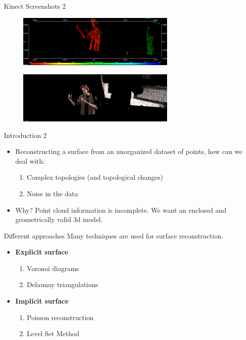 \documentclass{beamer}
\begin{document}
\begin{frame}{Kinect Screenshots 2}
  \begin{figure}[H]
  \centering
  \includegraphics[width=0.7\textwidth]{img/pts.png}
  \end{figure}
  \begin{figure}[H]
  \centering
  \includegraphics[width=0.7\textwidth]{img/pcl.png}
  \end{figure}
\end{frame}

\begin{frame}{Introduction 2}
  \begin{itemize}
  \item Reconstructing a surface from an unorganized dataset of points, how can we deal with:
  \begin{enumerate}
    \item Complex topologies (and topological changes)
    \item Noise in the data
  \end{enumerate}
  \item Why? Point cloud information is incomplete. We want an enclosed and geometrically valid 3d model.
  \end{itemize}
\end{frame}

\begin{frame}{Different approaches}
  Many techniques are used for surface reconstruction.
  \begin{itemize} %
  \item \textbf{Explicit surface} %
  \begin{enumerate}
    \item Voronoi diagrams
    \item Delaunay triangulations
  \end{enumerate}
  \item \textbf{Implicit surface} %
  \begin{enumerate}
    \item Poisson reconstruction
    \item Level Set Method
  \end{enumerate}
  \end{itemize}
\end{frame}
\end{document}
